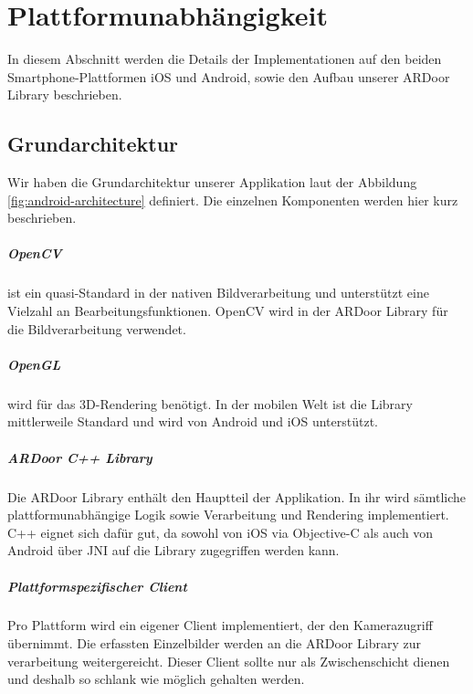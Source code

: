 \chapter{Plattformunabhängigkeit}

In diesem Abschnitt werden die Details der Implementationen auf den beiden Smartphone-Plattformen iOS und Android, sowie den Aufbau unserer ARDoor Library beschrieben.

\section{Grundarchitektur}
Wir haben die Grundarchitektur unserer Applikation laut der Abbildung \ref{fig:android-architecture} definiert. Die einzelnen Komponenten werden hier kurz beschrieben.

\paragraph{OpenCV}
ist ein quasi-Standard in der nativen Bildverarbeitung und unterstützt eine Vielzahl an Bearbeitungsfunktionen. OpenCV wird in der ARDoor Library für die Bildverarbeitung verwendet.

\paragraph{OpenGL}
wird für das 3D-Rendering benötigt. In der mobilen Welt ist die Library mittlerweile Standard und wird von Android und iOS unterstützt.

\paragraph{ARDoor C++ Library}
Die ARDoor Library enthält den Hauptteil der Applikation. In ihr wird sämtliche plattformunabhängige Logik sowie Verarbeitung und Rendering implementiert. C++ eignet sich  dafür gut, da sowohl von iOS via Objective-C als auch von Android über JNI auf die Library zugegriffen werden kann.

\paragraph{Plattformspezifischer Client}
Pro Plattform wird ein eigener Client implementiert, der den Kamerazugriff übernimmt. Die erfassten Einzelbilder werden an die ARDoor Library zur verarbeitung weitergereicht. Dieser Client sollte nur als Zwischenschicht dienen und deshalb so schlank wie möglich gehalten werden. 


